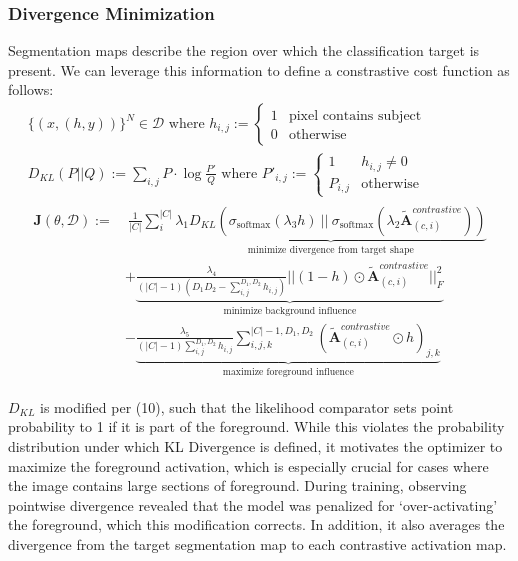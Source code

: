 \documentclass{article}
\begin{document}
\subsubsection{Divergence Minimization}
Segmentation maps describe the region over which the classification target is present. We can leverage this information to define a constrastive cost function as follows:
\begin{gather}
	\{(x, (h, y))\}^N \in \mathcal{D} \text{ where } h_{i,j} := \begin{cases}
		1 & \text{pixel contains subject} \\
		0 & \text{otherwise}
	\end{cases} \\
	D_{KL}(P || Q) := \sum_{i,j} P \cdot \log \frac{P'}{Q} \text{ where } 
	P'_{i,j} := \begin{cases}
		1 & h_{i,j} \neq 0 \\
		P_{i,j} & \text{otherwise}
	\end{cases} \label{d_kl} \\
	\begin{split}
		\mathcal{\bm{J}}(\theta, \mathcal{D}) := &\ \frac{1}{|C|} \sum^{|C|}_{i} \underbrace{\lambda_1 D_{KL}(\sigma_{\text{softmax}}(\lambda_3 h)\ ||\ \sigma_{\text{softmax}}(\lambda_2 \tilde{\mathcal{\bm{A}}}^{\textit{contrastive}}_{(c, i)}))}_{\text{minimize divergence from target shape}} \\
		&+ \underbrace{\frac{\lambda_4}{(|C| - 1) \left(D_1 D_2 - \sum^{D_1,D_2}_{i,j}h_{i,j}\right)} || (1 - h) \odot \tilde{\mathcal{\bm{A}}}^{\textit{contrastive}}_{(c, i)}||^2_F}_{\text{minimize background influence}} \\
		&- \underbrace{\frac{\lambda_5}{(|C| - 1) \sum^{D_1,D_2}_{i,j}h_{i,j}} \sum^{|C|-1,D_1,D_2}_{i,j,k} \left(\tilde{\mathcal{\bm{A}}}^{\textit{contrastive}}_{(c,i)} \odot h\right)_{j,k} }_{\text{maximize foreground influence}}
	\end{split}
\end{gather}

$D_{KL}$ is modified per (10), such that the likelihood comparator sets point probability to 1 if it is part of the foreground. While this violates the probability distribution under which KL Divergence is defined, it motivates the optimizer to maximize the foreground activation, which is especially crucial for cases where the image contains large sections of foreground. During training, observing pointwise divergence revealed that the model was penalized for `over-activating' the foreground, which this modification corrects. In addition, it also averages the divergence from the target segmentation map to each contrastive activation map.
\end{document}
